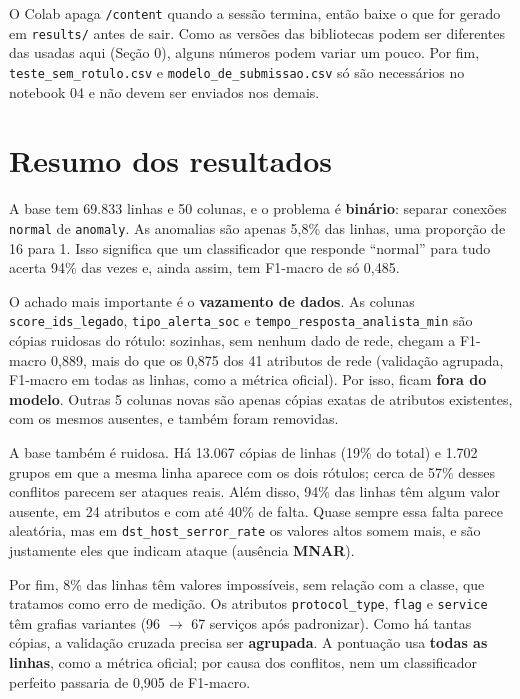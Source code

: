 \documentclass[11pt,a4paper]{article}
\begin{document}
O Colab apaga \texttt{/content} quando a sessão termina, então baixe o que for gerado em \texttt{results/} antes de sair. Como as versões das bibliotecas podem ser diferentes das usadas aqui (Seção 0), alguns números podem variar um pouco. Por fim, \texttt{teste\_sem\_rotulo.csv} e \texttt{modelo\_de\_submissao.csv} só são necessários no notebook 04 e não devem ser enviados nos demais.

\section*{Resumo dos resultados}

A base tem 69.833 linhas e 50 colunas, e o problema é \textbf{binário}: separar conexões \texttt{normal} de \texttt{anomaly}. As anomalias são apenas 5,8\% das linhas, uma proporção de 16 para 1. Isso significa que um classificador que responde ``normal'' para tudo acerta 94\% das vezes e, ainda assim, tem F1-macro de só 0,485.

O achado mais importante é o \textbf{vazamento de dados}. As colunas \texttt{score\_ids\_legado}, \texttt{tipo\_alerta\_soc} e \texttt{tempo\_resposta\_analista\_min} são cópias ruidosas do rótulo: sozinhas, sem nenhum dado de rede, chegam a F1-macro 0,889, mais do que os 0,875 dos 41 atributos de rede (validação agrupada, F1-macro em todas as linhas, como a métrica oficial). Por isso, ficam \textbf{fora do modelo}. Outras 5 colunas novas são apenas cópias exatas de atributos existentes, com os mesmos ausentes, e também foram removidas.

A base também é ruidosa. Há 13.067 cópias de linhas (19\% do total) e 1.702 grupos em que a mesma linha aparece com os dois rótulos; cerca de 57\% desses conflitos parecem ser ataques reais. Além disso, 94\% das linhas têm algum valor ausente, em 24 atributos e com até 40\% de falta. Quase sempre essa falta parece aleatória, mas em \texttt{dst\_host\_serror\_rate} os valores altos somem mais, e são justamente eles que indicam ataque (ausência \textbf{MNAR}).

Por fim, 8\% das linhas têm valores impossíveis, sem relação com a classe, que tratamos como erro de medição. Os atributos \texttt{protocol\_type}, \texttt{flag} e \texttt{service} têm grafias variantes (96 $\rightarrow$ 67 serviços após padronizar). Como há tantas cópias, a validação cruzada precisa ser \textbf{agrupada}. A pontuação usa \textbf{todas as linhas}, como a métrica oficial; por causa dos conflitos, nem um classificador perfeito passaria de 0,905 de F1-macro.
\end{document}
